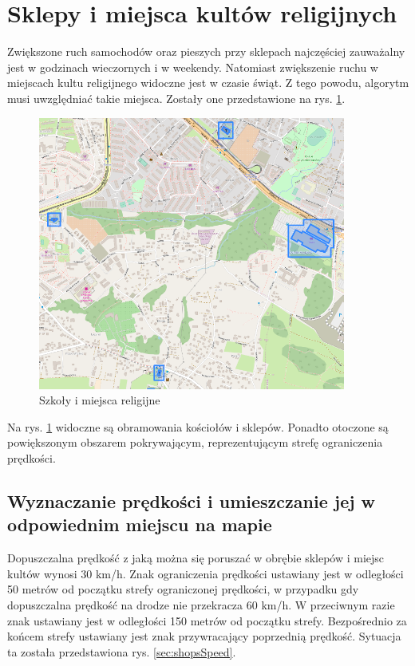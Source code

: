 \newpage
\section{Sklepy i miejsca kultów religijnych}
\label{sec:shoopsChurchesMain}

Zwiększone ruch samochodów oraz pieszych przy sklepach najczęściej zauważalny jest w godzinach wieczornych i w weekendy. Natomiast zwiększenie ruchu w miejscach kultu religijnego widoczne jest w czasie świąt. Z tego powodu, algorytm musi uwzględniać takie miejsca. Zostały one przedstawione na rys. \ref{sec:shopsBorder}.

\begin{figure}[h]
\caption{Szkoły i miejsca religijne}
\label{sec:shopsBorder}
\centering
\includegraphics[width=0.9\textwidth]{shopsBorder}
\end{figure}

Na rys. \ref{sec:shopsBorder} widoczne są obramowania kościołów i sklepów. Ponadto otoczone są powiększonym obszarem pokrywającym, reprezentującym strefę ograniczenia prędkości.

\newpage
\subsection{Wyznaczanie prędkości i umieszczanie jej w odpowiednim miejscu na mapie}

Dopuszczalna prędkość z jaką można się poruszać w obrębie sklepów i miejsc kultów wynosi 30 km/h. Znak ograniczenia prędkości ustawiany jest w odległości 50 metrów od początku strefy ograniczonej prędkości, w przypadku gdy dopuszczalna prędkość na drodze nie przekracza 60 km/h. W przeciwnym razie znak ustawiany jest w odległości 150 metrów od początku strefy. Bezpośrednio za końcem strefy ustawiany jest znak przywracający poprzednią prędkość. Sytuacja ta została przedstawiona rys. \ref{sec:shopsSpeed}.

